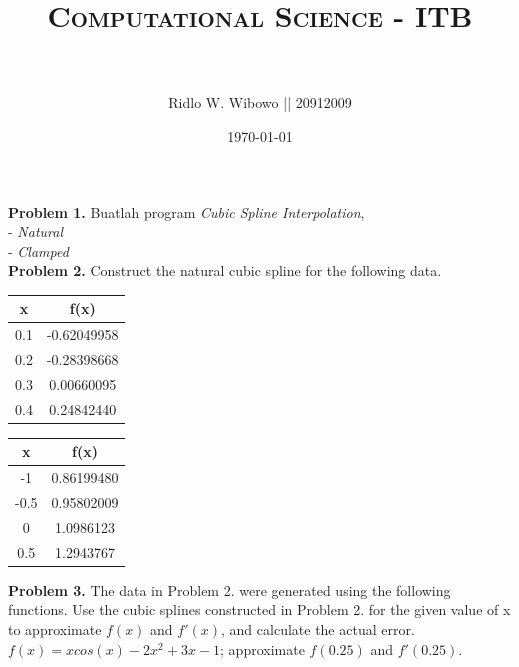 \documentclass[paper=a4, fontsize=11pt]{scrartcl}
\title{	
\normalfont \normalsize 
\textsc{Computational Science - ITB} \\ [25pt] %
\horrule{0.5pt} \\[0.4cm] %
}
\author{\small{Ridlo W. Wibowo || 20912009}} %
\date{\normalsize\today} %
\numberwithin{equation}{section} %
\numberwithin{figure}{section} %
\numberwithin{table}{section} %
\begin{document}
\maketitle %

\large \textbf{Problem 1.}
Buatlah program \textit{Cubic Spline Interpolation},\\
- \textit{Natural}\\ 
- \textit{Clamped}\\

\large \textbf{Problem 2.}
Construct the natural cubic spline for the following data.\\
\begin{table}[ht]
\begin{tabular}{c c} %
\hline%
x & f(x) \\ [0.5ex] %
\hline                  %
0.1 & -0.62049958 \\
0.2 & -0.28398668 \\
0.3 & 0.00660095 \\
0.4 & 0.24842440 \\ [1ex]
\hline %
\end{tabular}
\end{table}
\begin{table}[ht]
\begin{tabular}{c c}
\hline
x & f(x) \\ [0.5ex]
\hline 
-1 & 0.86199480 \\
-0.5 & 0.95802009 \\
0 & 1.0986123 \\
0.5 & 1.2943767 \\ [1ex]
\hline 
\end{tabular}
\end{table}

\large \textbf{Problem 3.}
The data in Problem 2. were generated using the following functions. Use the cubic splines constructed in Problem 2. for the given value of x to approximate $f(x)$ and $f'(x)$, and calculate the actual error.\\

$f(x) = xcos(x) - 2x^{2} + 3x - 1$; approximate $f(0.25)$ and $f'(0.25)$.\\
\end{document}
